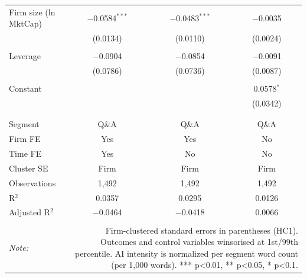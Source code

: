 \begin{table}[!htbp]
\begin{tabular}{@{\extracolsep{5pt}}lccc}
 Firm size (ln MktCap) & $-$0.0584$^{***}$ & $-$0.0483$^{***}$ & $-$0.0035 \\ 
  & (0.0134) & (0.0110) & (0.0024) \\ 
  & & & \\ 
 Leverage & $-$0.0904 & $-$0.0854 & $-$0.0091 \\ 
  & (0.0786) & (0.0736) & (0.0087) \\ 
  & & & \\ 
 Constant &  &  & 0.0578$^{*}$ \\ 
  &  &  & (0.0342) \\ 
  & & & \\ 
\hline \\[-1.8ex] 
Segment & Q\&A & Q\&A & Q\&A \\ 
Firm FE & Yes & Yes & No \\ 
Time FE & Yes & No & No \\ 
Cluster SE & Firm & Firm & Firm \\ 
Observations & 1,492 & 1,492 & 1,492 \\ 
R$^{2}$ & 0.0357 & 0.0295 & 0.0126 \\ 
Adjusted R$^{2}$ & $-$0.0464 & $-$0.0418 & 0.0066 \\ 
\hline 
\hline \\[-1.8ex] 
\textit{Note:}  & \multicolumn{3}{r}{Firm-clustered standard errors in parentheses (HC1). Outcomes and control variables winsorised at 1st/99th percentile. AI intensity is normalized per segment word count (per 1,000 words). *** p<0.01, ** p<0.05, * p<0.1.} \\ 
\end{tabular} 
\end{table} 
